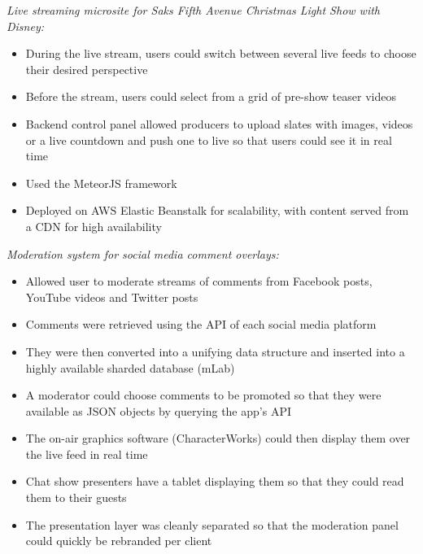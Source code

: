 \item \textit{Live streaming microsite for \emph{Saks Fifth Avenue Christmas Light Show with Disney}:}
    \begin{itemize}%
        \item During the live stream, users could switch between several live feeds to choose their desired perspective
        \item Before the stream, users could select from a grid of pre-show teaser videos
        \item Backend control panel allowed producers to upload slates with images, videos or a live countdown and push one to live so that users could see it in real time
        \item Used the MeteorJS framework
        \item Deployed on AWS Elastic Beanstalk for scalability, with content served from a CDN for high availability
    \end{itemize}
    \bigbreak
\item \textit{Moderation system for social media comment overlays:}
    \begin{itemize}
        \item Allowed user to moderate streams of comments from Facebook posts, YouTube videos and Twitter posts
        \item Comments were retrieved using the API of each social media platform
        \item They were then converted into a unifying data structure and inserted into a highly available sharded database (mLab)
        \item A moderator could choose comments to be promoted so that they were available as JSON objects by querying the app's API
        \item The on-air graphics software (CharacterWorks) could then display them over the live feed in real time
        \item Chat show presenters have a tablet displaying them so that they could read them to their guests
        \item The presentation layer was cleanly separated so that the moderation panel could quickly be rebranded per client
    \end{itemize}
    \bigbreak
